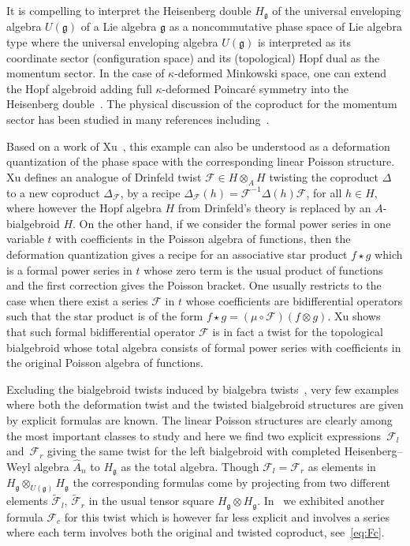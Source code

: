 \documentclass[10pt,a4paper]{amsart}
\def\gg{\mathfrak{g}}
\numberwithin{equation}{section}
\begin{document}
It is compelling to interpret the Heisenberg double $H_\gg$ of the universal enveloping algebra $U(\gg)$ of a Lie algebra $\gg$ as a noncommutative phase space of Lie algebra type where the universal enveloping algebra $U(\gg)$ is interpreted as its coordinate sector (configuration space) and its (topological) Hopf dual as the momentum sector. In the case of $\kappa$-deformed Minkowski space, one can extend the Hopf algebroid adding full $\kappa$-deformed Poincar\'e symmetry into the Heisenberg double~\cite{JLZSMWPLB,JLZSMW}. The physical discussion of the coproduct for the momentum sector has been studied in many references including~\cite{Amelino,HallidaySzabo}.

Based on a work of Xu~\cite{xu}, this example can also be understood as a deformation quantization of the phase space with the corresponding linear Poisson structure. Xu defines an analogue of Drinfeld twist $\mathcal{F}\in H\otimes_A H$ twisting the coproduct $\Delta$ to a new coproduct $\Delta_{\mathcal{F}}$, by a recipe $\Delta_{\mathcal{F}}(h)=\mathcal{F}^{-1}\Delta(h)\mathcal{F}$, for all $h\in H$, where however the Hopf algebra $H$ from Drinfeld's theory is replaced by an $A$-bialgebroid $H$. On the other hand, if we consider the formal power series in one variable $t$ with coefficients in the Poisson algebra of functions, then the deformation quantization gives a recipe for an associative star product $f\star g$ which is a formal power series in $t$ whose zero term is the usual product of functions and the first correction gives the Poisson bracket. One usually restricts to the case when there exist a series $\mathcal{F}$ in $t$ whose coefficients are bidifferential operators such that the star product is of the form $f\star g = (\mu\circ \mathcal{F})(f\otimes g)$. Xu shows that such formal bidifferential operator $\mathcal{F}$ is in fact a twist for the topological bialgebroid whose total algebra consists of formal power series with coefficients in the original Poisson algebra of functions.

Excluding the bialgebroid twists induced by bialgebra twists~\cite{borpacholtwistedoid}, very few examples where both the deformation twist and the twisted bialgebroid structures are given by explicit formulas are known. The linear Poisson structures are clearly among the most important classes to study and here we find two explicit expressions~$\mathcal{F}_l$ and~$\mathcal{F}_r$ giving the same twist for the left bialgebroid with completed Heisenberg--Weyl algebra $\hat{A}_n$ to $H_\gg$ as the total algebra. Though $\mathcal{F}_l=\mathcal{F}_r$ as elements in $H_\gg\otimes_{U(\gg)} H_\gg$ the corresponding formulas come by projecting from two different elements $\tilde{\mathcal{F}}_l$, $\tilde{\mathcal{F}}_r$ in the usual tensor square $H_\gg\otimes H_\gg$. In~\cite{scopr} we exhibited another formula $\mathcal{F}_c$ for this twist which is however far less explicit and involves a series where each term involves both the original and twisted coproduct, see~\eqref{eq:Fc}.
\end{document}
